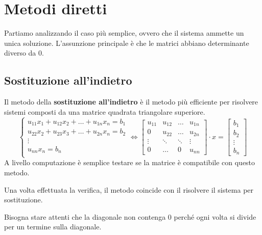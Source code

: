 \chapter{Metodi diretti}
Partiamo analizzando il caso più semplice, ovvero che il sistema ammette un unica
soluzione. L'assunzione principale è che le matrici abbiano determinante diverso
da $0$.
\section{Sostituzione all'indietro}
Il metodo della \textbf{sostituzione all'indietro} è il metodo più efficiente per
risolvere sistemi composti da una matrice quadrata triangolare superiore.
\begin{equation}
    \begin{cases}
        u_{11}x_1 + u_{12} x_2 + \dots + u_{1n} x_n= b_1 \\
        u_{22}x_2 + u_{23} x_3 + \dots + u_{2n} x_n= b_2 \\
        \vdots                                           \\
        u_{nn}x_n = b_n                                  \\
    \end{cases} \iff \left[\begin{array}{cccc}
            u_{11} & u_{12} & \dots  & u_{1n} \\
            0      & u_{22} & \dots  & u_{2n} \\
            \vdots & \ddots & \ddots & \vdots \\
            0      & \dots  & 0      & u_{nn}
        \end{array} \right] \cdot x = \left[\begin{array}{c}
            b_1    \\
            b_2    \\
            \vdots \\
            b_n
        \end{array}\right]
\end{equation}
A livello computazione è semplice testare se la matrice è compatibile con questo
metodo.

Una volta effettuata la verifica, il metodo coincide con il risolvere il sistema
per sostituzione.
\begin{nota}
    Bisogna stare attenti che la diagonale non contenga $0$ perché ogni volta
    si divide per un termine sulla diagonale.
\end{nota}

